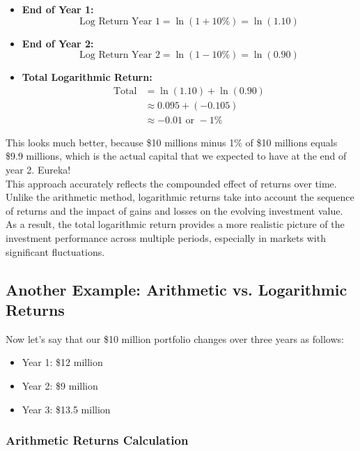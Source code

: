 \documentclass{article}
\begin{document}
\begin{itemize}
    \item \textbf{End of Year 1:}
      \[ \text{Log Return Year 1} = \ln(1 + 10\%) = \ln(1.10) \]
    \item \textbf{End of Year 2:}
      \[ \text{Log Return Year 2} = \ln(1 - 10\%) = \ln(0.90) \]
    \item \textbf{Total Logarithmic Return:}
      \begin{align*}
      \text{Total} &= \ln(1.10) + \ln(0.90) \\
                   &\approx 0.095 + (-0.105) \\
                   &\approx -0.01 \text{ or } -1\%
      \end{align*}
\end{itemize}

This looks much better, because \$10 millions minus 1\% of \$10 millions equals \$9.9 millions, which is the actual capital that we expected to have at the end of year 2. Eureka! \\

This approach accurately reflects the compounded effect of returns over time. Unlike the arithmetic method, logarithmic returns take into account the sequence of returns and the impact of gains and losses on the evolving investment value. As a result, the total logarithmic return provides a more realistic picture of the investment performance across multiple periods, especially in markets with significant fluctuations.          
\\

\subsection{Another Example: Arithmetic vs. Logarithmic Returns}

Now let's say that our \$10 million portfolio changes over three years as follows:

\begin{itemize}
    \item Year 1: \$12 million
    \item Year 2: \$9 million
    \item Year 3: \$13.5 million
\end{itemize}

\subsubsection{Arithmetic Returns Calculation}
\end{document}
